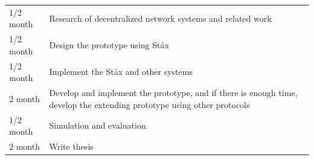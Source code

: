 \begin{table}
	\centering
	\begin{tabular}{ p{2cm} p{13cm} }
		1/2 month & Research of decentralized network systems and related work \\
		1/2 month & Design the prototype using St\aa x \\
		1/2 month & Implement the St\aa x and other systems \\
		2 month & Develop and implement the prototype, and if there is enough time, develop the extending prototype using other protocols \\
		1/2 month & Simulation and evaluation \\
		2 month & Write thesis \\
	\end{tabular}
\end{table}




